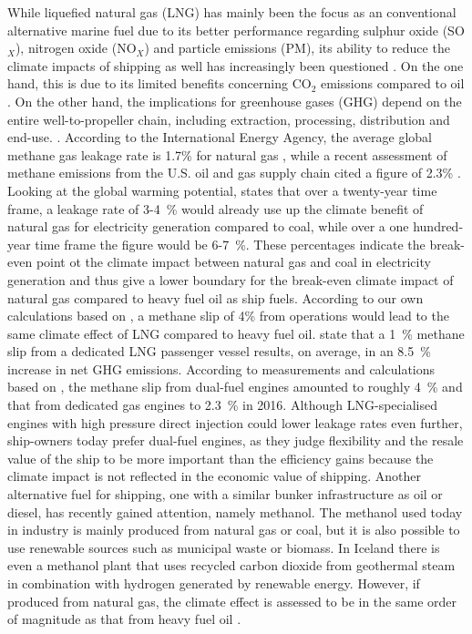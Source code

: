 \documentclass[article]{elsarticle}
\begin{document}
While liquefied natural gas (LNG) has mainly been the focus as an conventional alternative marine fuel \cite{IMO2016a,DNVGL2015} due to its better performance regarding sulphur oxide (SO$_X$), nitrogen oxide (NO$_X$) and particle emissions (PM), its ability to reduce the climate impacts of shipping as well has increasingly been questioned \cite{BRYNOLF2014b}. On the one hand, this is due to its limited benefits concerning CO$_2$ emissions compared to oil \cite{DNVGL2014}. On the other hand, the implications for greenhouse gases (GHG) depend on the entire well-to-propeller chain, including extraction, processing, distribution and end-use. \cite{THOMSON2015}. According to the International Energy Agency, the average global methane gas leakage rate is 1.7\% for natural gas \cite{IEA2017}, while a recent assessment of methane emissions from the U.S. oil and gas supply chain cited a figure of 2.3\% \cite{Alvarez2018}. Looking at the global warming potential, \citet{IEA2017} states that over a twenty-year time frame, a leakage rate of 3-4~\% would already use up the climate benefit of natural gas for electricity generation compared to coal, while over a one hundred-year time frame the figure would be 6-7~\%. These percentages indicate the break-even point ot the climate impact between natural gas and coal in electricity generation and thus give a lower boundary for the break-even climate impact of natural gas compared to heavy fuel oil as ship fuels. According to our own calculations based on \cite{BRYNOLF2014}, a methane slip of 4\% from operations would lead to the same climate effect of LNG compared to heavy fuel oil. \citet{HAGOS2018} state that a 1~\% methane slip from a dedicated LNG passenger vessel results, on average, in an 8.5~\% increase in net GHG emissions. According to measurements and calculations based on \cite{Corbett2015,Stenersen2017}, the methane slip from dual-fuel engines amounted to roughly 4~\% and that from dedicated gas engines to 2.3~\% in 2016. Although LNG-specialised engines with high pressure direct injection could lower leakage rates even further, ship-owners today prefer dual-fuel engines, as they judge flexibility and the resale value of the ship to be more important than the efficiency gains because the climate impact is not reflected in the economic value of shipping. Another alternative fuel for shipping, one with a similar bunker infrastructure as oil or diesel, has recently gained attention, namely methanol. The methanol used today in industry is mainly produced from natural gas or coal, but it is also possible to use renewable sources such as municipal waste or biomass. In Iceland there is even a methanol plant that uses recycled carbon dioxide from geothermal steam in combination with hydrogen generated by renewable energy. However, if produced from natural gas, the climate effect is assessed to be in the same order of magnitude as that from heavy fuel oil \cite{BRYNOLF2014,DNVGL2018}. 
\end{document}
